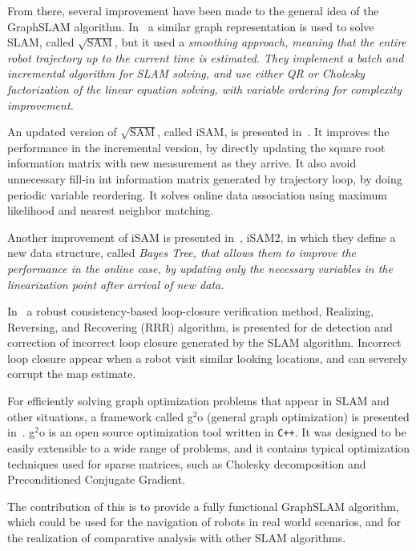 From there, several improvement have been made to the general idea of the GraphSLAM algorithm. In~\cite{sqrtsam} a similar graph representation is used to solve SLAM, called $\sqrt{\text{SAM}}$, but it used a \it{smoothing} approach, meaning that the entire robot trajectory up to the current time is estimated. They implement a batch and incremental algorithm for SLAM solving, and use either QR or Cholesky factorization of the linear equation solving, with variable ordering for complexity improvement. 

An updated version of $\sqrt{\text{SAM}}$, called iSAM, is presented in~\cite{isam}. It improves the performance in the incremental version, by directly updating the square root information matrix with new measurement as they arrive. It also avoid unnecessary fill-in int information matrix generated by trajectory loop, by doing periodic variable reordering. It solves online data association using maximum likelihood and nearest neighbor matching.

Another improvement of iSAM is presented in~\cite{isam2}, iSAM2, in which they define a new data structure, called \it{Bayes Tree}, that allows them to improve the performance in the online case, by updating only the necessary variables in the linearization point after arrival of new data. 

In~\cite{robustloop} a robust consistency-based loop-closure verification method, Realizing, Reversing, and Recovering (RRR) algorithm, is presented for de detection and correction of incorrect loop closure generated by the SLAM algorithm. Incorrect loop closure appear when a robot visit similar looking locations, and can severely corrupt the map estimate.     

For efficiently solving graph optimization problems that appear in SLAM and other situations, a framework called g$^2$o (general graph optimization) is presented in~\cite{g2o}. g$^2$o is an open source optimization tool written in \verb!C++!.  It was designed to be easily extensible to a wide range of problems, and it contains typical optimization techniques used for sparse matrices, such as Cholesky decomposition and Preconditioned Conjugate Gradient. 

The contribution of this \mem{} is to provide a fully functional GraphSLAM algorithm, which could be used for the navigation of robots in real world scenarios, and for the realization of comparative analysis with other SLAM algorithms.
